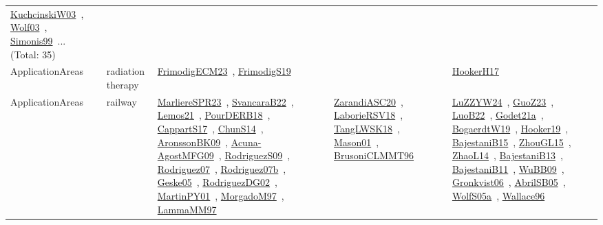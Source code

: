 {\begin{longtable}{lp{3cm}>{\raggedright\arraybackslash}p{6cm}>{\raggedright\arraybackslash}p{6cm}>{\raggedright\arraybackslash}p{8cm}}
\href{../works/KuchcinskiW03.pdf}{KuchcinskiW03}~\cite{KuchcinskiW03}, \href{../works/Wolf03.pdf}{Wolf03}~\cite{Wolf03}, \href{../works/Simonis99.pdf}{Simonis99}~\cite{Simonis99}... (Total: 35)\\
\index{radiation therapy}\index{ApplicationAreas!radiation therapy}ApplicationAreas & radiation therapy & \href{../works/FrimodigECM23.pdf}{FrimodigECM23}~\cite{FrimodigECM23}, \href{../works/FrimodigS19.pdf}{FrimodigS19}~\cite{FrimodigS19} &  & \href{../works/HookerH17.pdf}{HookerH17}~\cite{HookerH17}\\
\index{railway}\index{ApplicationAreas!railway}ApplicationAreas & railway & \href{../works/MarliereSPR23.pdf}{MarliereSPR23}~\cite{MarliereSPR23}, \href{../works/SvancaraB22.pdf}{SvancaraB22}~\cite{SvancaraB22}, \href{../works/Lemos21.pdf}{Lemos21}~\cite{Lemos21}, \href{../works/PourDERB18.pdf}{PourDERB18}~\cite{PourDERB18}, \href{../works/CappartS17.pdf}{CappartS17}~\cite{CappartS17}, \href{../works/ChunS14.pdf}{ChunS14}~\cite{ChunS14}, \href{../works/AronssonBK09.pdf}{AronssonBK09}~\cite{AronssonBK09}, \href{../works/Acuna-AgostMFG09.pdf}{Acuna-AgostMFG09}~\cite{Acuna-AgostMFG09}, \href{../works/RodriguezS09.pdf}{RodriguezS09}~\cite{RodriguezS09}, \href{../works/Rodriguez07.pdf}{Rodriguez07}~\cite{Rodriguez07}, \href{../works/Rodriguez07b.pdf}{Rodriguez07b}~\cite{Rodriguez07b}, \href{../works/Geske05.pdf}{Geske05}~\cite{Geske05}, \href{../works/RodriguezDG02.pdf}{RodriguezDG02}~\cite{RodriguezDG02}, \href{../works/MartinPY01.pdf}{MartinPY01}~\cite{MartinPY01}, \href{../works/MorgadoM97.pdf}{MorgadoM97}~\cite{MorgadoM97}, \href{../works/LammaMM97.pdf}{LammaMM97}~\cite{LammaMM97} & \href{../works/ZarandiASC20.pdf}{ZarandiASC20}~\cite{ZarandiASC20}, \href{../works/LaborieRSV18.pdf}{LaborieRSV18}~\cite{LaborieRSV18}, \href{../works/TangLWSK18.pdf}{TangLWSK18}~\cite{TangLWSK18}, \href{../works/Mason01.pdf}{Mason01}~\cite{Mason01}, \href{../works/BrusoniCLMMT96.pdf}{BrusoniCLMMT96}~\cite{BrusoniCLMMT96} & \href{../works/LuZZYW24.pdf}{LuZZYW24}~\cite{LuZZYW24}, \href{../works/GuoZ23.pdf}{GuoZ23}~\cite{GuoZ23}, \href{../works/LuoB22.pdf}{LuoB22}~\cite{LuoB22}, \href{../works/Godet21a.pdf}{Godet21a}~\cite{Godet21a}, \href{../works/BogaerdtW19.pdf}{BogaerdtW19}~\cite{BogaerdtW19}, \href{../works/Hooker19.pdf}{Hooker19}~\cite{Hooker19}, \href{../works/BajestaniB15.pdf}{BajestaniB15}~\cite{BajestaniB15}, \href{../works/ZhouGL15.pdf}{ZhouGL15}~\cite{ZhouGL15}, \href{../works/ZhaoL14.pdf}{ZhaoL14}~\cite{ZhaoL14}, \href{../works/BajestaniB13.pdf}{BajestaniB13}~\cite{BajestaniB13}, \href{../works/BajestaniB11.pdf}{BajestaniB11}~\cite{BajestaniB11}, \href{../works/WuBB09.pdf}{WuBB09}~\cite{WuBB09}, \href{../works/Gronkvist06.pdf}{Gronkvist06}~\cite{Gronkvist06}, \href{../works/AbrilSB05.pdf}{AbrilSB05}~\cite{AbrilSB05}, \href{../works/WolfS05a.pdf}{WolfS05a}~\cite{WolfS05a}, \href{../works/Wallace96.pdf}{Wallace96}~\cite{Wallace96}\\

\end{longtable}}
